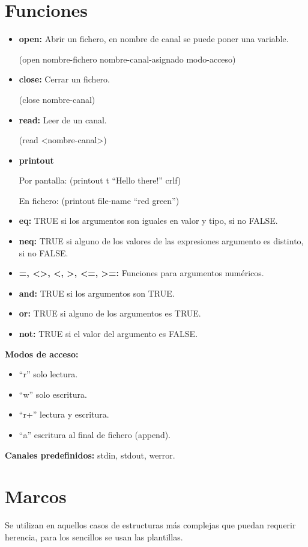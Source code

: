 \documentclass[12pt, twoside, openright]{report} %
\begin{document}
\section{Funciones}
\begin{itemize}
	\item \textbf{open:} Abrir un fichero, en nombre de canal se puede poner una variable.

	      (open nombre-fichero nombre-canal-asignado modo-acceso)
	\item \textbf{close:} Cerrar un fichero.

	      (close nombre-canal)
	\item \textbf{read:} Leer de un canal.

	      (read <nombre-canal>)
	\item \textbf{printout}

	      Por pantalla: (printout t “Hello there!” crlf)

	      En fichero: (printout file-name “red green”)
	\item \textbf{eq:} TRUE si los argumentos son iguales en valor y tipo, si no FALSE.
	\item \textbf{neq:} TRUE si alguno de los valores de las expresiones argumento es distinto, si no FALSE.
	\item \textbf{=, <>, <, >, <=, >=:} Funciones para argumentos numéricos.
	\item \textbf{and:} TRUE si los argumentos son TRUE.
	\item \textbf{or:} TRUE si alguno de los argumentos es TRUE.
	\item \textbf{not:} TRUE si el valor del argumento es FALSE.
\end{itemize}

\textbf{Modos de acceso:}
\begin{itemize}
	\item “r” solo lectura.
	\item “w” solo escritura.
	\item “r+” lectura y escritura.
	\item “a” escritura al final de fichero (append).
\end{itemize}

\textbf{Canales predefinidos:} stdin, stdout, werror.
\section{Marcos}
Se utilizan en aquellos casos de estructuras más complejas que puedan requerir herencia, para los sencillos se usan las plantillas.
\end{document}
